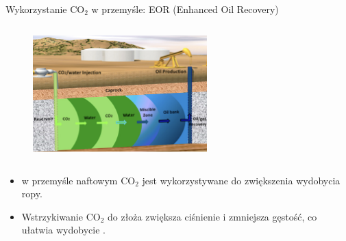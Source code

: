 \begin{columnframe}{Wykorzystanie CO$_2$ w przemyśle: EOR (Enhanced Oil Recovery)}
    \begin{column}{0.5\textwidth}
        \begin{figure}
            \centering
            \includegraphics[width=0.6\textwidth, frame]{images/enhanced_oil_recovery.png}
        \end{figure}
    \end{column}
    \begin{column}{0.5\textwidth}
        \begin{itemize}
            \item w przemyśle naftowym CO$_2$ jest wykorzystywane do zwiększenia wydobycia ropy.
            \item Wstrzykiwanie CO$_2$ do złoża zwiększa ciśnienie i zmniejsza gęstość, co ułatwia wydobycie .
        \end{itemize}
    \end{column}
\end{columnframe}


